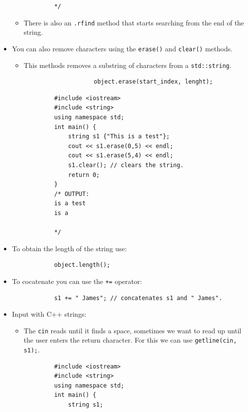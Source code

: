 \begin{itemize}
\begin{verbatim}
            */
        \end{verbatim}
        \begin{itemize}
            \item There is also an \texttt{.rfind} method that starts searching from the end of the string.
        \end{itemize}
    
    \item You can also remove characters using the \texttt{erase()} and \texttt{clear()} methods.
        \begin{itemize}
            \item This methods removes a substring of characters from a \texttt{std::string}.
                \begin{verbatim}
                    object.erase(start_index, lenght);
                \end{verbatim}
        \end{itemize}
        \begin{verbatim}
            #include <iostream>
            #include <string>
            using namespace std;
            int main() {
                string s1 {"This is a test"};
                cout << s1.erase(0,5) << endl;
                cout << s1.erase(5,4) << endl;
                s1.clear(); // clears the string.
                return 0;
            }
            /* OUTPUT:
            is a test
            is a

            */
        \end{verbatim}
    
    \item To obtain the length of the string use:
        \begin{verbatim}
            object.length();
        \end{verbatim}
    
    \item To cocatenate you can use the \texttt{+=} operator:
        \begin{verbatim}
            s1 += " James"; // concatenates s1 and " James".
        \end{verbatim}

    
    \item Input with C++ strings:
        \begin{itemize}
            \item The \texttt{cin} reads until it finds a space, sometimes we want to read up until the user enters the return character. For this we can use \texttt{getline(cin, s1);}.
        \end{itemize}
        \begin{verbatim}
            #include <iostream>
            #include <string>
            using namespace std;
            int main() {
                string s1;


\end{verbatim}
\end{itemize}
